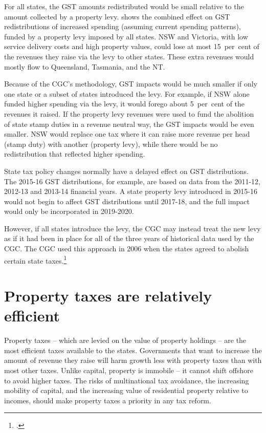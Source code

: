 \documentclass[twoside,english]{palatinob5portrait}
\begin{document}
For all states, the GST amounts redistributed would be small relative to the amount collected by a property levy.  shows the combined effect on GST redistributions of increased spending (assuming current spending patterns), funded by a property levy imposed by all states. NSW and Victoria, with low service delivery costs and high property values, could lose at most 15~per~cent of the revenues they raise via the levy to other states. These extra revenues would mostly flow to Queensland, Tasmania, and the NT\@.



Because of the CGC’s methodology, GST impacts would be much smaller if only one state or a subset of states introduced the levy. For example, if NSW alone funded higher spending via the levy, it would forego about 5~per~cent of the revenues it raised. If the property levy revenues were used to fund the abolition of state stamp duties in a revenue neutral way, the GST impacts would be even smaller. NSW would replace one tax where it can raise more revenue per head (stamp duty) with another (property levy), while there would be no redistribution that reflected higher spending.  

State tax policy changes normally have a delayed effect on GST distributions. The 2015-16 GST distributions, for example, are based on data from the 2011-12, 2012-13 and 2013-14 financial years. A state property levy introduced in 2015-16 would not begin to affect GST distributions until 2017-18, and the full impact would only be incorporated in 2019-2020. 

However, if all states introduce the levy, the CGC may instead treat the new levy as if it had been in place for all of the three years of historical data used by the CGC\@. The CGC used this approach in 2006 when the states agreed to abolish certain state taxes.\footcite[][23]{CGC2015-Volume2}  

\chapter{Property taxes are relatively efficient}
Property taxes – which are levied on the value of property holdings – are the most efficient taxes available to the states. Governments that want to increase the amount of revenue they raise will harm growth less with property taxes than with most other taxes. Unlike capital, property is immobile – it cannot shift offshore to avoid higher taxes. The risks of multinational tax avoidance, the increasing mobility of capital, and the increasing value of residential property relative to incomes, should make property taxes a priority in any tax reform. 
\enlargethispage{2\baselineskip}
\end{document}
